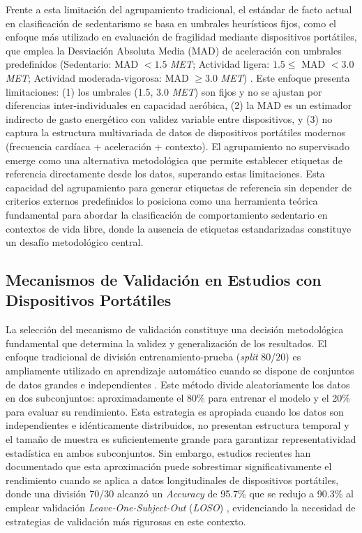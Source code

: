 Frente a esta limitación del agrupamiento tradicional, el estándar de facto actual en clasificación de sedentarismo se basa en umbrales heurísticos fijos, como el enfoque más utilizado en evaluación de fragilidad mediante dispositivos portátiles, que emplea la Desviación Absoluta Media (MAD) de aceleración con umbrales predefinidos (Sedentario: MAD $< 1.5$ \textit{MET}; Actividad ligera: $1.5 \leq$ MAD $< 3.0$ \textit{MET}; Actividad moderada-vigorosa: MAD $\geq 3.0$ \textit{MET}) \cite{Razjouyan2018Frailty}. Este enfoque presenta limitaciones: (1) los umbrales (1.5, 3.0 \textit{MET}) son fijos y no se ajustan por diferencias inter-individuales en capacidad aeróbica, (2) la MAD es un estimador indirecto de gasto energético con validez variable entre dispositivos, y (3) no captura la estructura multivariada de datos de dispositivos portátiles modernos (frecuencia cardíaca + aceleración + contexto). El agrupamiento no supervisado emerge como una alternativa metodológica que permite establecer etiquetas de referencia directamente desde los datos, superando estas limitaciones. Esta capacidad del agrupamiento para generar etiquetas de referencia sin depender de criterios externos predefinidos lo posiciona como una herramienta teórica fundamental para abordar la clasificación de comportamiento sedentario en contextos de vida libre, donde la ausencia de etiquetas estandarizadas constituye un desafío metodológico central.

\subsection{Mecanismos de Validación en Estudios con Dispositivos Portátiles}
\label{subsec:mecanismos_validacion}

La selección del mecanismo de validación constituye una decisión metodológica fundamental que determina la validez y generalización de los resultados. El enfoque tradicional de división entrenamiento-prueba (\textit{split} 80/20) es ampliamente utilizado en aprendizaje automático cuando se dispone de conjuntos de datos grandes e independientes \cite{Pedregosa2011sklearn}. Este método divide aleatoriamente los datos en dos subconjuntos: aproximadamente el 80\% para entrenar el modelo y el 20\% para evaluar su rendimiento. Esta estrategia es apropiada cuando los datos son independientes e idénticamente distribuidos, no presentan estructura temporal y el tamaño de muestra es suficientemente grande para garantizar representatividad estadística en ambos subconjuntos. Sin embargo, estudios recientes han documentado que esta aproximación puede sobrestimar significativamente el rendimiento cuando se aplica a datos longitudinales de dispositivos portátiles, donde una división 70/30 alcanzó un \textit{Accuracy} de 95.7\% que se redujo a 90.3\% al emplear validación \textit{Leave-One-Subject-Out} (\textit{LOSO}) \cite{Bassani2025DLHAR}, evidenciando la necesidad de estrategias de validación más rigurosas en este contexto.

